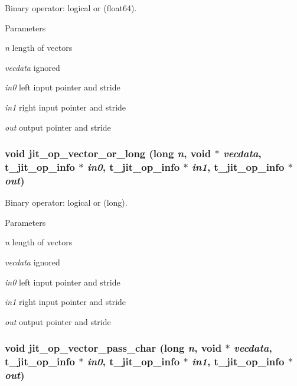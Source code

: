 Binary operator: logical or (float64). 
\begin{DoxyParams}{Parameters}
\item[{\em n}]length of vectors \item[{\em vecdata}]ignored \item[{\em in0}]left input pointer and stride \item[{\em in1}]right input pointer and stride \item[{\em out}]output pointer and stride \end{DoxyParams}
\hypertarget{group__opvecmod_gab2f7a15d7c4057dc2e3a348525b6b240}{
\subsubsection[{jit\_\-op\_\-vector\_\-or\_\-long}]{\setlength{\rightskip}{0pt plus 5cm}void jit\_\-op\_\-vector\_\-or\_\-long (long {\em n}, \/  void $\ast$ {\em vecdata}, \/  {\bf t\_\-jit\_\-op\_\-info} $\ast$ {\em in0}, \/  {\bf t\_\-jit\_\-op\_\-info} $\ast$ {\em in1}, \/  {\bf t\_\-jit\_\-op\_\-info} $\ast$ {\em out})}}
\label{group__opvecmod_gab2f7a15d7c4057dc2e3a348525b6b240}


Binary operator: logical or (long). 
\begin{DoxyParams}{Parameters}
\item[{\em n}]length of vectors \item[{\em vecdata}]ignored \item[{\em in0}]left input pointer and stride \item[{\em in1}]right input pointer and stride \item[{\em out}]output pointer and stride \end{DoxyParams}
\hypertarget{group__opvecmod_ga40972e92305f4e7a0355b12a858d25d1}{
\subsubsection[{jit\_\-op\_\-vector\_\-pass\_\-char}]{\setlength{\rightskip}{0pt plus 5cm}void jit\_\-op\_\-vector\_\-pass\_\-char (long {\em n}, \/  void $\ast$ {\em vecdata}, \/  {\bf t\_\-jit\_\-op\_\-info} $\ast$ {\em in0}, \/  {\bf t\_\-jit\_\-op\_\-info} $\ast$ {\em in1}, \/  {\bf t\_\-jit\_\-op\_\-info} $\ast$ {\em out})}}
\label{group__opvecmod_ga40972e92305f4e7a0355b12a858d25d1}


